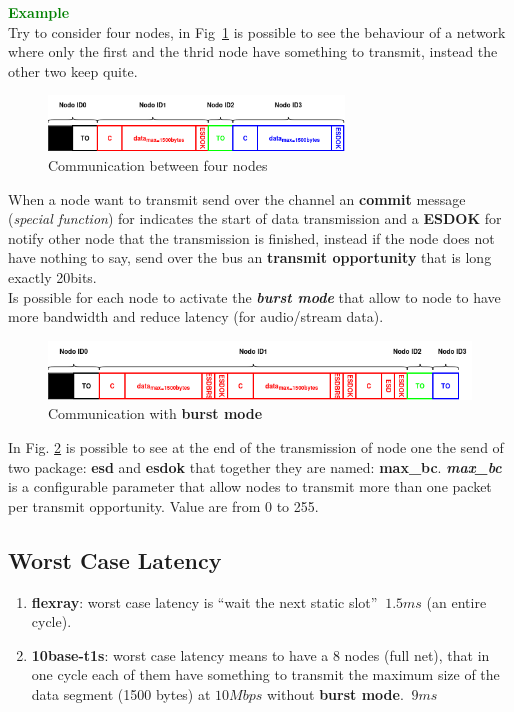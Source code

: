 \textcolor{green}{\textbf{Example}} \\
Try to consider four nodes, in Fig~\ref{fig:example_t1s} is possible to see the behaviour of a network where only the first and the thrid node have something to transmit, instead the other two keep quite.

\begin{figure}[h]
    \centering
    \includegraphics[width=0.7\textwidth]{img/t1s_ex_1}
    \caption{Communication between four nodes}
    \label{fig:example_t1s}
\end{figure}
When a node want to transmit send over the channel an \textbf{commit} message (\textit{special function}) for indicates the start of data transmission and a \textbf{ESDOK} for notify other node that the transmission is finished, instead if the node does not have nothing to say, send over the bus an \textbf{transmit opportunity} that is long exactly 20bits. \\ \newline
Is possible for each node to activate the \textbf{\textit{burst mode}} that allow to node to have more bandwidth and reduce latency (for audio/stream data).

\begin{figure}[h]
    \centering
    \includegraphics[width=\textwidth]{img/t1s_ex_2}
    \caption{Communication with \textbf{burst mode}}
    \label{fig:example_bm}
\end{figure}
In Fig. \ref{fig:example_bm} is possible to see at the end of the transmission of node one the send of two package: \textbf{esd} and \textbf{esdok} that together they are named: \textbf{max\_bc}. \textbf{\textit{max\_bc}} is a configurable parameter that allow nodes to transmit more than one packet per transmit opportunity. Value are from 0 to 255.

\subsection{Worst Case Latency}
\begin{enumerate}[nosep]
    \item \textbf{flexray}: worst case latency is ``wait the next static slot'' $~1.5ms$ (an entire cycle).
    \item \textbf{10base-t1s}: worst case latency means to have a 8 nodes (full net), that in one cycle each of them have something to transmit the maximum size of the data segment (1500 bytes) at $10Mbps$ without \textbf{burst mode}. $~9ms$
\end{enumerate}

